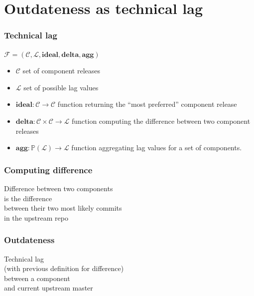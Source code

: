 \documentclass[17pt,aspectratio=169,hyperref={pdfusetitle,colorlinks,allcolors=olive}]{beamer}
\newcommand{\F}{\mathcal F}
\newcommand{\Co}{\mathcal C}
\newcommand{\lag}{\mathcal L}
\newcommand{\fideal}{\func{ideal}}
\newcommand{\fdelta}{\func{delta}}
\newcommand{\fagg}{\func{agg}}
\newcommand{\tuple}[1]{{\left( #1 \right)}}
\newcommand{\func}[1]{\mathbf{#1}}
\newcommand{\powerset}[1]{\mathbb P({#1})}
\begin{document}
\section{Outdateness as technical lag}


\begin{frame}[fragile]
  \frametitle{Technical lag}
  
{\small
$\F = \tuple{\Co, \lag, \fideal, \fdelta, \fagg}$

  \begin{itemize}
\item $\Co$ set of component releases
\item $\lag$ set of possible lag values
\item $\fideal: \Co \rightarrow \Co$ function returning the ``most preferred'' component release
\item $\fdelta: \Co \times \Co \rightarrow \lag$ function computing the difference between two component releases
\item $\fagg: \powerset\lag \rightarrow \lag$ function aggregating lag values for a set of components.
\end{itemize}
}
    
\end{frame}


\begin{frame}[fragile]
  \frametitle{Computing difference}

  {\large
  Difference between two components \\
  is the difference \\
  between their two most likely commits \\
  in the upstream repo \\
  }
\end{frame}


\begin{frame}[fragile]
  \frametitle{Outdateness}

  {\large
    Technical lag \\
    (with previous definition for difference) \\
    between a component \\
    and current upstream master \\
  }
\end{frame}
\end{document}
